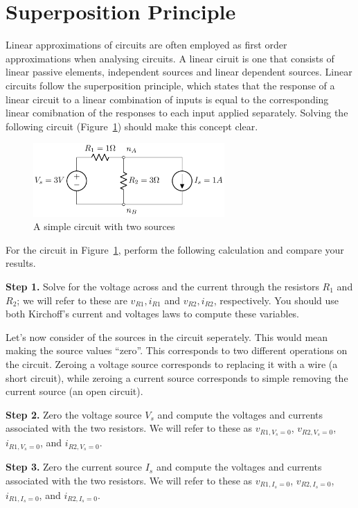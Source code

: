\section{Superposition Principle}
Linear approximations of circuits are often employed as first order approximations when analysing circuits. A linear ciruit is one that consists of linear passive elements, independent sources and linear dependent sources. Linear circuits follow the superposition principle, which states that the response of a linear circuit to a linear combination of inputs is equal to the corresponding linear comibnation of the responses to each input applied separately. Solving the following circuit (Figure~\ref{fig:02-03}) should make this concept clear.
\begin{figure}[t]
    \centering
    \includegraphics[width=0.65\textwidth]{figure/ch02/fig02-03.pdf}
    \caption{A simple circuit with two sources}
    \label{fig:02-03}
\end{figure}
For the circuit in Figure~\ref{fig:02-03}, perform the following calculation and compare your results.

\noindent\textbf{Step 1.} Solve for the voltage across and the current through the resistors $R_1$ and $R_2$; we will refer to these are $v_{R1}, i_{R1}$ and $v_{R2}, i_{R2}$, respectively. You should use both Kirchoff's current and voltages laws to compute these variables.

\noindent Let's now consider of the sources in the circuit seperately. This would mean making the source values ``zero''. This corresponds to two different operations on the circuit. Zeroing a voltage source corresponds to replacing it with a wire (a short circuit), while zeroing a current source corresponds to simple removing the current source (an open circuit). 

\noindent\textbf{Step 2.} Zero the voltage source $V_s$ and compute the voltages and currents associated with the two resistors. We will refer to these as $v_{R1,V_s=0}$, $v_{R2,V_s=0}$, $i_{R1,V_s=0}$, and $i_{R2,V_s=0}$.

\noindent\textbf{Step 3.} Zero the current source $I_s$ and compute the voltages and currents associated with the two resistors. We will refer to these as $v_{R1,I_s=0}$, $v_{R2,I_s=0}$, $i_{R1,I_s=0}$, and $i_{R2,I_s=0}$.

